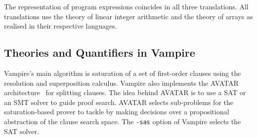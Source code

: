 The representation of program expressions coincides in all three translations. All translations use the theory of linear integer arithmetic and the theory of arrays as realised in their respective languages.





\subsection{Theories and Quantifiers in Vampire}\label{sec:boogie/experiments/vampire}
Vampire's main algorithm is saturation of a set of first-order clauses using the resolution and superposition calculus. Vampire also implements the AVATAR architecture~\cite{DBLP:conf/cav/Voronkov14} for splitting clauses. The idea behind AVATAR is to use a SAT or an SMT solver to guide proof search. AVATAR selects sub-problems for the saturation-based prover to tackle by making decisions over a propositional abstraction of the clause search space. The \verb'-sas' option of Vampire selects the SAT solver.

